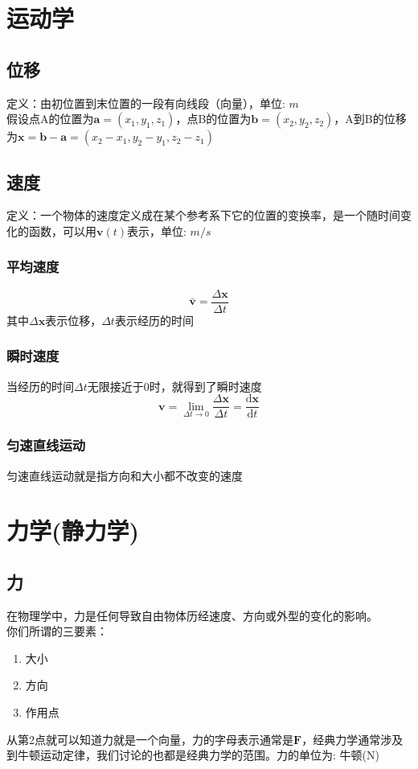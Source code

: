 \documentclass[a4paper, 11pt, oneside]{article}
\newcommand{\bol}[1]{\textbf{#1}}
\newcommand{\diff}{\mathrm{d}}
\begin{document}
\section{运动学}
\subsection{位移}
定义：由初位置到末位置的一段有向线段（向量），单位: $m$\\
假设点A的位置为$\bol{a} = (x_1, y_1, z_1)$，点B的位置为$\bol{b} = (x_2, y_2, z_2)$，A到B的位移为$\bol{x} = \bol{b} - \bol{a} = (x_2 - x_1 , y_2 - y_1, z_2 - z_1)$

\subsection{速度}
定义：一个物体的速度定义成在某个参考系下它的位置的变换率，是一个随时间变化的函数，可以用$\bol{v}(t)$表示，单位: $m/s$
\subsubsection{平均速度}
\begin{displaymath}
	\bar{\bol{v}} = \frac{\Delta \bol{x}}{\Delta t}
\end{displaymath}
其中$\Delta \bol{x}$表示位移，$\Delta t$表示经历的时间
\subsubsection{瞬时速度}
当经历的时间$\Delta t$无限接近于0时，就得到了瞬时速度
\begin{displaymath}
	\bol{v} = \lim_{\Delta t \to 0}\frac{\Delta \bol{x}}{\Delta t} = \frac{\diff\bol{x}}{\diff t}
\end{displaymath}
\subsubsection{匀速直线运动}
匀速直线运动就是指方向和大小都不改变的速度
\newpage
\section{力学(静力学)}
\subsection{力}
在物理学中，力是任何导致自由物体历经速度、方向或外型的变化的影响。\\
你们所谓的三要素：
\begin{enumerate}
	\item 大小
	\item 方向
	\item 作用点
\end{enumerate}
从第2点就可以知道力就是一个向量，力的字母表示通常是$\bol{F}$，经典力学通常涉及到牛顿运动定律，我们讨论的也都是经典力学的范围。力的单位为: 牛顿(N)
\end{document}
